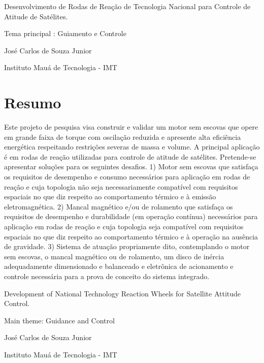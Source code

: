 \begin{center} 
\begin{LARGE}

	 Desenvolvimento de Rodas de Reação de Tecnologia Nacional para Controle 
	 de Atitude de Satélites. 
	
\end{LARGE}
\begin{large}

    Tema principal : Guiamento e Controle

	José Carlos de Souza Junior

	Instituto Mauá de Tecnologia - IMT

\end{large}

\end{center}

\section*{Resumo}



Este projeto de pesquisa visa construir e validar um motor sem escovas que opere em grande faixa de torque com oscilação reduzida e apresente alta eficiência energética respeitando restrições severas de massa e volume. A principal aplicação é em rodas de reação utilizadas para controle de atitude de satélites. Pretende-se apresentar soluções para os seguintes desafios. 1) Motor sem escovas que satisfaça os requisitos de desempenho e consumo necessários para aplicação em rodas de reação e cuja topologia não seja necessariamente compatível com requisitos espaciais no que diz respeito ao comportamento térmico e à emissão eletromagnética. 2) Mancal magnético e/ou de rolamento que satisfaça os requisitos de desempenho e durabilidade (em operação contínua) necessários para aplicação em rodas de reação e cuja topologia seja compatível com requisitos espaciais no que diz respeito ao comportamento térmico e à operação na ausência de gravidade. 3) Sistema de atuação propriamente dito, contemplando o motor sem escovas, o mancal magnético ou de rolamento, um disco de inércia adequadamente dimensionado e balanceado e eletrônica de acionamento e controle necessária para a prova de conceito do sistema integrado.

\newpage


\thispagestyle{empty}
\begin{center}
\begin{LARGE}

	Development of National Technology Reaction Wheels  for Satellite Attitude Control. 

\end{LARGE}
\begin{large}

	Main theme: Guidance and Control

	José Carlos de Souza Junior

	Instituto Mauá de Tecnologia - IMT

\end{large}

\end{center}

